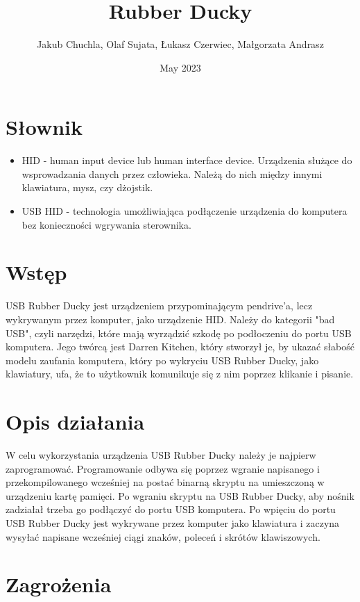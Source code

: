 \documentclass{article}
\title{Rubber Ducky}
\author{Jakub Chuchla, Olaf Sujata, Łukasz Czerwiec, Małgorzata Andrasz}
\date{May 2023}
\begin{document}
\maketitle

\tableofcontents

\section{Słownik}
\begin{itemize}
    \item HID - human input device lub human interface device. Urządzenia służące do wsprowadzania danych przez człowieka. Należą do nich między innymi klawiatura, mysz, czy dżojstik.
    \item USB HID - technologia umożliwiająca podłączenie urządzenia do komputera bez konieczności wgrywania sterownika.
\end{itemize}

\section{Wstęp}

USB Rubber Ducky jest urządzeniem przypominającym pendrive'a, lecz wykrywanym przez komputer, jako urządzenie HID. Należy do kategorii "bad USB", czyli narzędzi, które mają wyrządzić szkodę po podłoczeniu do portu USB komputera. Jego twórcą jest Darren Kitchen, który stworzył je, by ukazać słabość modelu zaufania komputera, który po wykryciu USB Rubber Ducky, jako klawiatury, ufa, że to użytkownik komunikuje się z nim poprzez klikanie i pisanie.

\section{Opis działania}

W celu wykorzystania urządzenia USB Rubber Ducky należy je najpierw zaprogramować. Programowanie odbywa się poprzez wgranie napisanego i przekompilowanego wcześniej na postać binarną skryptu na umieszczoną w urządzeniu kartę pamięci. Po wgraniu skryptu na USB Rubber Ducky, aby nośnik zadziałał trzeba go podłączyć do portu USB komputera. Po wpięciu do portu USB Rubber Ducky jest wykrywane przez komputer jako klawiatura i zaczyna wysyłać napisane wcześniej ciągi znaków, poleceń i skrótów klawiszowych.
\section{Zagrożenia}
\end{document}
